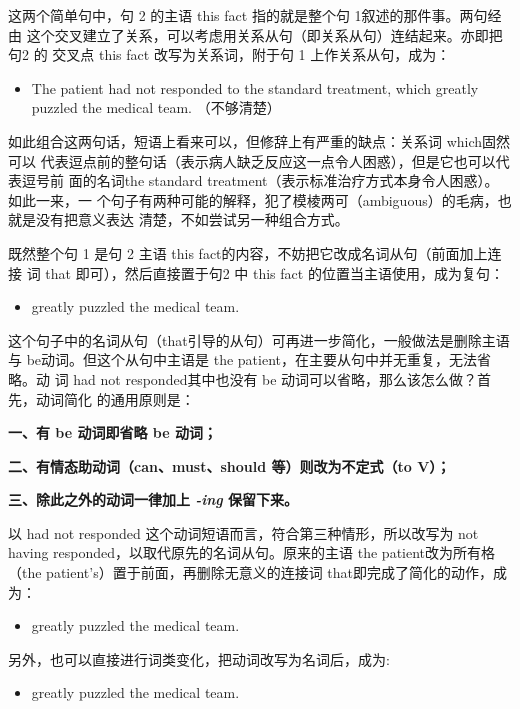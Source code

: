 这两个简单句中，句 2 的主语 this fact 指的就是整个句 1叙述的那件事。两句经由
这个交叉建立了关系，可以考虑用关系从句（即关系从句）连结起来。亦即把句2 的
交叉点 this fact 改写为关系词，附于句 1 上作关系从句，成为：
\begin{itemize}
\item The patient had not responded to the standard treatment, which greatly
  puzzled the medical team. （不够清楚）
\end{itemize}

如此组合这两句话，短语上看来可以，但修辞上有严重的缺点：关系词 which固然可以
代表逗点前的整句话（表示病人缺乏反应这一点令人困惑），但是它也可以代表逗号前
面的名词the standard treatment（表示标准治疗方式本身令人困惑）。如此一来，一
个句子有两种可能的解释，犯了模棱两可（ambiguous）的毛病，也就是没有把意义表达
清楚，不如尝试另一种组合方式。

既然整个句 1 是句 2 主语 this fact的内容，不妨把它改成名词从句（前面加上连接
词 that 即可），然后直接置于句2 中 this fact 的位置当主语使用，成为复句：
\begin{itemize}
\item {} greatly
  puzzled the medical team.
\end{itemize}
这个句子中的名词从句（that引导的从句）可再进一步简化，一般做法是删除主语
与 be动词。但这个从句中主语是 the patient，在主要从句中并无重复，无法省略。动
词 had not responded其中也没有 be 动词可以省略，那么该怎么做？首先，动词简化
的通用原则是：

\textbf{一、有 be 动词即省略 be 动词；}

\textbf{二、有情态助动词（can、must、should 等）则改为不定式（to V）；}

\textbf{三、除此之外的动词一律加上 \emph{-ing} 保留下来。}

以 had not responded 这个动词短语而言，符合第三种情形，所以改写为 not having
responded，以取代原先的名词从句。原来的主语 the patient改为所有格（the
patient's）置于前面，再删除无意义的连接词 that即完成了简化的动作，成为：
\begin{itemize}
\item {}
  greatly puzzled the medical team.
\end{itemize}

另外，也可以直接进行词类变化，把动词改写为名词后，成为:
\begin{itemize}
\item {} greatly
  puzzled the medical team.
\end{itemize}

